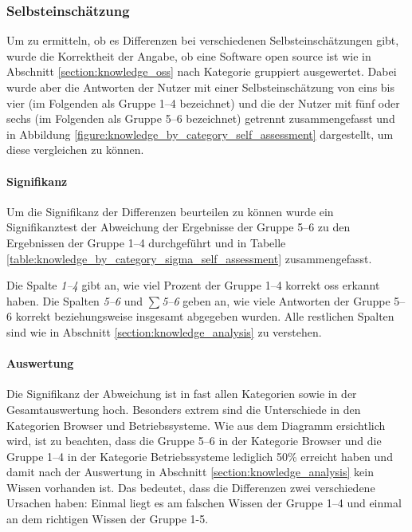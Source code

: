 \documentclass[a4paper]{article}
\begin{document}
            \subsubsection{Selbsteinschätzung}
                Um zu ermitteln, ob es Differenzen bei verschiedenen Selbsteinschätzungen gibt, wurde die Korrektheit der Angabe, ob eine Software open source ist wie in Abschnitt \ref{section:knowledge_oss} nach Kategorie gruppiert ausgewertet. Dabei wurde aber die Antworten der Nutzer mit einer Selbsteinschätzung von eins bis vier (im Folgenden als Gruppe 1--4 bezeichnet) und die der Nutzer mit fünf oder sechs (im Folgenden als Gruppe 5--6 bezeichnet) getrennt zusammengefasst und in Abbildung \ref{figure:knowledge_by_category_self_assessment} dargestellt, um diese vergleichen zu können.
                
                \paragraph{Signifikanz}
                    Um die Signifikanz der Differenzen beurteilen zu können wurde ein Signifikanztest der Abweichung der Ergebnisse der Gruppe 5--6 zu den Ergebnissen der Gruppe 1--4 durchgeführt und in Tabelle \ref{table:knowledge_by_category_sigma_self_assessment} zusammengefasst.
                    
                    Die Spalte \emph{1--4} gibt an, wie viel Prozent der Gruppe 1--4 korrekt \gls{oss} erkannt haben. Die Spalten \emph{5--6} und \emph{$\sum$5--6} geben an, wie viele Antworten der Gruppe 5--6 korrekt beziehungsweise insgesamt abgegeben wurden. Alle restlichen Spalten sind wie in Abschnitt \ref{section:knowledge_analysis} zu verstehen.
                        
                \paragraph{Auswertung}
                    Die Signifikanz der Abweichung ist in fast allen Kategorien sowie in der Gesamtauswertung hoch. Besonders extrem sind die Unterschiede in den Kategorien Browser und Betriebssysteme. Wie aus dem Diagramm ersichtlich wird, ist zu beachten, dass die Gruppe 5--6 in der Kategorie Browser und die Gruppe 1--4 in der Kategorie Betriebssysteme lediglich 50\% erreicht haben und damit nach der Auswertung in Abschnitt \ref{section:knowledge_analysis} kein Wissen vorhanden ist. Das bedeutet, dass die Differenzen zwei verschiedene Ursachen haben: Einmal liegt es am falschen Wissen der Gruppe 1--4 und einmal an dem richtigen Wissen der Gruppe 1-5.
                    
\end{document}
